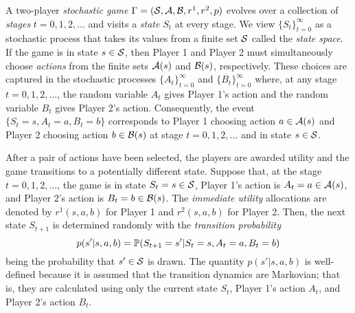     A two-player \emph{stochastic game} $\Gamma = (\mathcal{S}, \mathcal{A}, \mathcal{B}, r^1, r^2, p)$ evolves over a collection of \emph{stages} $t = 0, 1, 2, \ldots$ and visits a \emph{state} $S_t$ at every stage.
    We view $\{S_t\}_{t = 0}^{\infty}$ as a stochastic process that takes its values from a finite set $\mathcal{S}$ called the \emph{state space}.
    If the game is in state $s \in \mathcal{S}$, then Player 1 and Player 2 must simultaneously choose \emph{actions} from the finite sets $\mathcal{A}(s)$ and $\mathcal{B}(s)$, respectively.
    These choices are captured in the stochastic processes $\{A_t\}_{t = 0}^\infty$ and $\{B_t\}_{t = 0}^\infty$ where, at any stage $t = 0, 1, 2, \ldots$, the random variable $A_t$ gives Player 1's action and the random variable $B_t$ gives Player 2's action.
    Consequently, the event $\{S_t = s, A_t = a, B_t = b\}$ corresponds to Player 1 choosing action $a \in \mathcal{A}(s)$ and Player 2 choosing action $b \in \mathcal{B}(s)$ at stage $t = 0, 1, 2, \ldots$ and in state $s \in \mathcal{S}$.

    After a pair of actions have been selected, the players are awarded utility and the game transitions to a potentially different state.
    Suppose that, at the stage $t = 0, 1, 2, \ldots$, the game is in state $S_t = s \in \mathcal{S}$, Player 1's action is $A_t = a \in \mathcal{A}(s)$, and Player 2's action is $B_t = b \in \mathcal{B}(s)$.
    The \emph{immediate utility} allocations are denoted by $r^1(s, a, b)$ for Player 1 and $r^2(s, a, b)$ for Player 2.
    Then, the next state $S_{t + 1}$ is determined randomly with the \emph{transition probability}
    \begin{equation} \label{eq:transition-probabilities}
        p(s' | s, a, b)
            = \mathbb{P} (S_{t + 1} = s' | S_t = s, A_t = a, B_t = b)
    \end{equation}
    being the probability that $s' \in \mathcal{S}$ is drawn.
    The quantity $p(s' | s, a, b)$ is well-defined because it is assumed that the transition dynamics are Markovian; that is, they are   calculated using only the current state $S_t$, Player 1's action $A_t$, and Player 2's action $B_t$.

